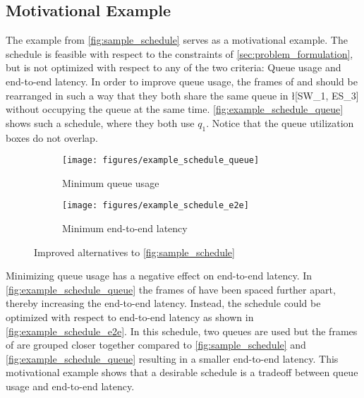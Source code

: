 \subsection{Motivational Example}
The example from \autoref{fig:sample_schedule} serves as a motivational example. The schedule is feasible with respect to the constraints of \autoref{sec:problem_formulation}, but is not optimized with respect to any of the two criteria: Queue usage and end-to-end latency. In order to improve queue usage, the frames of \s[1] and \s[2] should be rearranged in such a way that they both share the same queue in \l[SW_1, ES_3] without occupying the queue at the same time. \autoref{fig:example_schedule_queue} shows such a schedule, where they both use $q_1$. Notice that the queue utilization boxes do not overlap.
\begin{figure}[t]
\centering
	\begin{subfigure}{\linewidth}
        \centering
        \texttt{[image: figures/example\_schedule\_queue]}
        \caption{Minimum queue usage}
        \label{fig:example_schedule_queue}
   \end{subfigure}
	\begin{subfigure}{\linewidth}
        \centering
        \texttt{[image: figures/example\_schedule\_e2e]}
        \caption{Minimum end-to-end latency}
        \label{fig:example_schedule_e2e}
   \end{subfigure}
   \caption{Improved alternatives to \autoref{fig:sample_schedule}}
\end{figure}


Minimizing queue usage has a negative effect on end-to-end latency. In \autoref{fig:example_schedule_queue} the frames of \s[2] have been spaced further apart, thereby increasing the end-to-end latency. Instead, the schedule could be optimized with respect to end-to-end latency as shown in \autoref{fig:example_schedule_e2e}.
In this schedule, two queues are used but the frames of \s[2] are grouped closer together compared to \autoref{fig:sample_schedule} and \autoref{fig:example_schedule_queue} resulting in a smaller end-to-end latency. This motivational example shows that a desirable schedule is a tradeoff between queue usage and end-to-end latency.